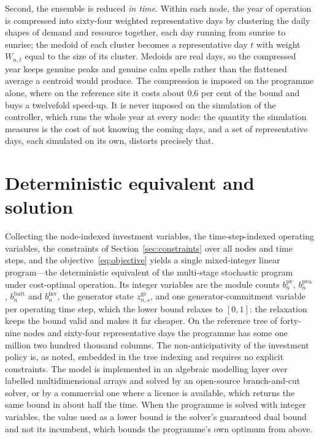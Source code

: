\documentclass[11pt,a4paper]{article}
\theoremstyle{plain}
\theoremstyle{definition}
\begin{document}
Second, the ensemble is reduced \emph{in time}. Within each node, the year of operation is
compressed into sixty-four weighted representative days by clustering the daily shapes of
demand and resource together, each day running from sunrise to sunrise; the medoid of each
cluster becomes a representative day $t$ with weight $W_{n,t}$ equal to the size of its
cluster. Medoids are real days, so the compressed year keeps genuine peaks and genuine calm
spells rather than the flattened average a centroid would produce. The compression is
imposed on the programme alone, where on the reference site it costs about 0.6 per cent of
the bound and buys a twelvefold speed-up. It is never imposed on the simulation of the
controller, which runs the whole year at every node: the quantity the simulation measures
is the cost of not knowing the coming days, and a set of representative days, each simulated
on its own, distorts precisely that.

\section{Deterministic equivalent and solution}
\label{sec:solution}

Collecting the node-indexed investment variables, the time-step-indexed operating
variables, the constraints of Section~\ref{sec:constraints} over all nodes and time
steps, and the objective~\eqref{eq:objective} yields a single mixed-integer linear
program---the deterministic equivalent of the multi-stage stochastic program under
cost-optimal operation. Its integer variables are the module counts $b^{\mathrm{pv}}_n$,
$b^{\mathrm{pva}}_n$, $b^{\mathrm{batt}}_n$ and $b^{\mathrm{inv}}_n$, the generator state
$z^{\mathrm{ge}}_{n,s}$, and one generator-commitment variable per operating time step,
which the lower bound relaxes to $[0,1]$: the relaxation keeps the bound valid and makes it
far cheaper. On the reference tree of forty-nine nodes and sixty-four representative days the
programme has some one million two hundred thousand columns. The non-anticipativity of the
investment policy is, as noted, embedded in the tree indexing and requires no explicit
constraints. The model is implemented in an algebraic modelling layer over labelled
multidimensional arrays and solved by an open-source branch-and-cut solver, or by a
commercial one where a licence is available, which returns the same bound in about half the
time. When the programme is solved with integer variables, the value used as a lower bound
is the solver's guaranteed dual bound and not its incumbent, which bounds the programme's own
optimum from above.
\end{document}
